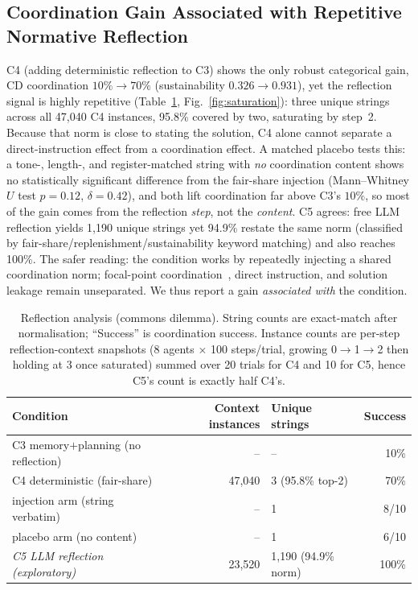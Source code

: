 \documentclass[runningheads]{llncs}
\begin{document}
\subsection{Coordination Gain Associated with Repetitive Normative Reflection}\label{sec:results-reflection}
C4 (adding deterministic reflection to C3) shows the only robust categorical gain, CD coordination $10\%\rightarrow70\%$ (sustainability $0.326\rightarrow0.931$), yet the reflection signal is highly repetitive (Table~\ref{tab:refl}, Fig.~\ref{fig:saturation}): three unique strings across all 47{,}040 C4 instances, 95.8\% covered by two, saturating by step~2. Because that norm is close to stating the solution, C4 alone cannot separate a direct-instruction effect from a coordination effect. A matched placebo tests this: a tone-, length-, and register-matched string with \emph{no} coordination content shows no statistically significant difference from the fair-share injection (Mann--Whitney $U$ test $p=0.12$, $\delta=0.42$), and both lift coordination far above C3's $10\%$, so most of the gain comes from the reflection \emph{step}, not the \emph{content}. C5 agrees: free LLM reflection yields 1{,}190 unique strings yet 94.9\% restate the same norm (classified by fair-share/replenishment/sustainability keyword matching) and also reaches 100\%. The safer reading: the condition works by repeatedly injecting a shared coordination norm; focal-point coordination~\cite{aharon2026tacit}, direct instruction, and solution leakage remain unseparated. We thus report a gain \emph{associated with} the condition.
\begin{table}[t]
\centering
\caption{Reflection analysis (commons dilemma). String counts are exact-match after normalisation; ``Success'' is coordination success. Instance counts are per-step reflection-context snapshots (8 agents $\times$ 100 steps/trial, growing 0$\to$1$\to$2 then holding at 3 once saturated) summed over 20 trials for C4 and 10 for C5, hence C5's count is exactly half C4's.}
\label{tab:refl}
\small
\setlength{\tabcolsep}{6pt}
\begin{tabular}{l r l r}
\toprule
Condition & Context instances & Unique strings & Success \\
\midrule
C3 memory$+$planning (no reflection) & -- & -- & 10\% \\
C4 deterministic (fair-share) & 47{,}040 & 3 (95.8\% top-2) & 70\% \\
\quad injection arm (string verbatim) & -- & 1 & 8/10 \\
\quad placebo arm (no content) & -- & 1 & 6/10 \\
\emph{C5 LLM reflection (exploratory)} & 23{,}520 & 1{,}190 (94.9\% norm) & 100\% \\
\bottomrule
\end{tabular}
\end{table}
\end{document}
